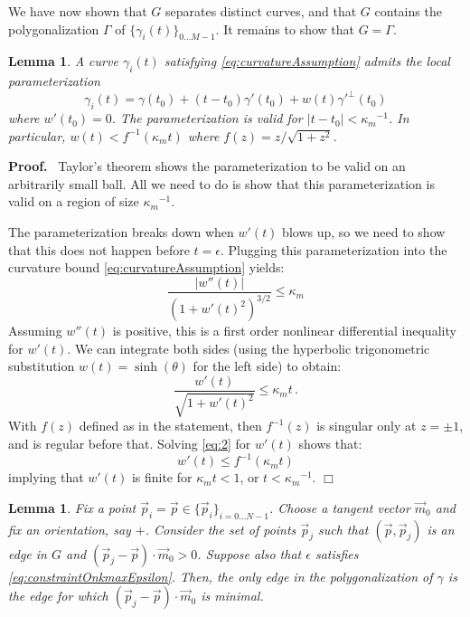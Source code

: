 \documentclass{article}
\newenvironment{proof}{
  \noindent\textbf{Proof.}\ }{\hspace*{\fill}
  \begin{math}\Box\end{math}\medskip}
\newtheorem{lemma}[cntr]{Lemma}
\numberwithin{cntr}{section}
\numberwithin{equation}{section}
\newcommand{\abs}[1]{\left| #1 \right|}%
\newcommand{\vp}[0]{{\vec{p}}}
\newcommand{\vm}[0]{{\vec{m}}}
\newcommand{\Oto}[1]{{0 \ldots #1-1}}
\newcommand{\OtoN}{{0 \ldots N-1}}
\newcommand{\pointData}{{ \{ \vp_{i} \}_{i=\OtoN} }}
\newcommand{\curveSet}{{ \{ \gamma_i(t) \}_{\Oto{M}}}}
\newcommand{\curvemax}{{\kappa_{m}}}
\newcommand{\curvemaxi}{{\curvemax^{-1}}}
\begin{document}
We have now shown that $G$ separates distinct curves, and that $G$ contains the polygonalization $\Gamma$ of $\curveSet$. It remains to show that $G = \Gamma$.

\begin{lemma}
  \label{lem:localGraphParameterization}
  A curve $\gamma_{i}(t)$ satisfying \eqref{eq:curvatureAssumption} admits the local parameterization
  \begin{equation}
    \label{eq:localGraphParameterization}
    \gamma_{i}(t) = \gamma(t_{0}) + (t-t_{0})\gamma'(t_{0}) + w(t) \gamma'^{\perp}(t_{0})
  \end{equation}
  where $w'(t_{0})=0$. The parameterization is valid for $\abs{t-t_{0}} < \curvemaxi$. In particular, $w(t) < f^{-1}(\curvemax t) $ where $f(z)=z / \sqrt{1+z^{2}}$.
\end{lemma}

\begin{proof}
  Taylor's theorem shows the parameterization to be valid on an arbitrarily small ball. All we need to do is show that this parameterization is valid on a region of size $\curvemaxi$.

  The parameterization breaks down when $w'(t)$ blows up, so we need to show that this does not happen before $t=\epsilon$. Plugging this parameterization into the curvature bound \eqref{eq:curvatureAssumption} yields:
  \begin{equation*}
    \frac{ \abs{w''(t)} }{(1+w'(t)^{2})^{3/2}} \leq \curvemax
  \end{equation*}
  Assuming $w''(t)$ is positive, this is a first order nonlinear differential inequality for $w'(t)$. We can integrate both sides (using the hyperbolic trigonometric substitution $w(t)=\sinh(\theta)$ for the left side) to obtain:
  \begin{equation}
    \label{eq:2}
    \frac{w'(t)}{\sqrt{1+w'(t)^{2}}} \leq \curvemax t \, .
  \end{equation}
  With $f(z)$ defined as in the statement, then $f^{-1}(z)$ is singular only at $z=\pm 1$, and is regular before that. Solving \eqref{eq:2} for $w'(t)$ shows that:
  \begin{equation*}
    w'(t) \leq f^{-1}(\curvemax t)
  \end{equation*}
  implying that $w'(t)$ is finite for $\curvemax t < 1$, or $t < \curvemaxi$.
\end{proof}

\begin{lemma}
  \label{lem:closestTangentPointInAllowedRegionIsCorrect}
  Fix a point $\vp_{i}=\vp \in \pointData$. Choose a tangent vector $\vm_{0}$ and fix an orientation, say $+$. Consider the set of points $\vp_{j}$ such that $(\vp, \vp_{j})$ is an edge in $G$ and $(\vp_{j} - \vp) \cdot \vm_{0} > 0$. Suppose also that $\epsilon$ satisfies \eqref{eq:constraintOnkmaxEpsilon}.
Then, the only edge in the polygonalization of $\gamma$ is the edge for which $(\vp_{j} - \vp) \cdot \vm_{0}$ is minimal.
\end{lemma}
\end{document}

